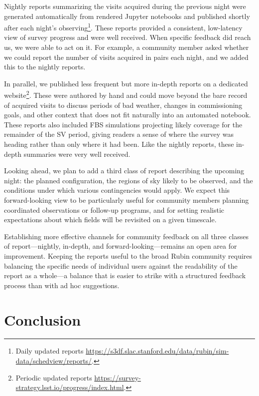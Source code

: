 Nightly reports summarizing the visits acquired during the previous night were
generated automatically from rendered Jupyter notebooks and published shortly
after each night's observing\footnote{Daily updated reports 
\url{https://s3df.slac.stanford.edu/data/rubin/sim-data/schedview/reports/}.}. 
These reports provided a consistent, low-latency
view of survey progress and were well received. When specific feedback did
reach us, we were able to act on it. For example, a community member asked
whether we could report the number of visits acquired in pairs each night,
and we added this to the nightly reports. 

In parallel, we published less frequent but more in-depth reports on a
dedicated website\footnote{Periodic updated reports  \url{https://survey-strategy.lsst.io/progress/index.html}.}. 
These were authored by hand and could move beyond the bare
record of acquired visits to discuss periods of bad weather, changes in
commissioning goals, and other context that does not fit naturally into an
automated notebook. These reports also included FBS simulations projecting
likely coverage for the remainder of the SV period, giving readers a sense of
where the survey was heading rather than only where it had been. Like the
nightly reports, these in-depth summaries were very well received. 

Looking ahead, we plan to add a third class of report describing the upcoming
night: the planned configuration, the regions of sky likely to be observed,
and the conditions under which various contingencies would apply. We expect
this forward-looking view to be particularly useful for community members
planning coordinated observations or follow-up programs, and for setting
realistic expectations about which fields will be revisited on a given
timescale. 

Establishing more effective channels for community feedback on all
three classes of report---nightly, in-depth, and forward-looking---remains an
open area for improvement. Keeping the reports useful to
the broad Rubin community requires balancing the specific needs of individual
users against the readability of the report as a whole---a balance that is
easier to strike with a structured feedback process than with ad hoc
suggestions.


\section{Conclusion}
\label{sec:conclusion}

